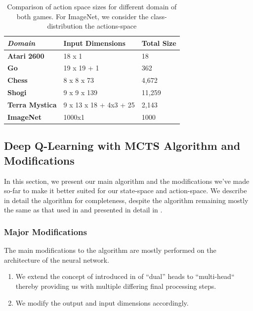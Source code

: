 \documentclass[10pt,twocolumn,letterpaper]{article}
\begin{document}
\begin{table}[!ht]
\begin{tabular}{|l|l|l|}
\hline
\textit{\textbf{Domain}} & \textbf{Input Dimensions} & \textbf{Total Size} \\ \hline
\textbf{Atari 2600}      & 18 x 1               & 18              \\ \hline
\textbf{Go}              & 19 x 19 + 1              & 362               \\ \hline
\textbf{Chess}           & 8 x 8 x 73               & 4,672               \\ \hline
\textbf{Shogi}           & 9 x 9 x 139               & 11,259              \\ \hline
\textbf{Terra Mystica}   & 9 x 13 x 18 + 4x3 + 25 &   2,143            \\ \hline
\textbf{ImageNet}        & 1000x1                 & 1000              \\ \hline
\end{tabular}
\caption{Comparison of action space sizes for different domain of both games. For ImageNet, we consider the class-distribution the actions-space}
\label{table:output_size_comparison}
\end{table}

\subsection{Deep Q-Learning with MCTS Algorithm and Modifications}
\label{subsection:deep_qlearning_with_mcts_algorithm_and_modifications}
In this section, we present our main algorithm and the modifications we've made so-far to make it better suited for our state-space and action-space. We describe in detail the algorithm for completeness, despite the algorithm remaining mostly the same as that used in \cite{AlphaZero} and presented in detail in \cite{AlphaGoZero}.

\subsubsection{Major Modifications}
\label{subsubsection:major_modifications}
The main modifications to the algorithm are mostly performed on the architecture of the neural network. 
\begin{enumerate}
    \item We extend the concept of introduced in \cite{AlphaGoZero} of ``dual'' heads to ``multi-head`` thereby providing us with multiple differing final processing steps. 
    \item We modify the output and input dimensions accordingly.
\end{enumerate}
\end{document}
